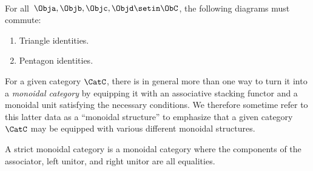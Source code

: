 \begin{ctdefinition}
    \condit\\
    For all~$\Obja,\Objb,\Objc,\Objd\setin \ObC$, the following diagrams must commute:
    \begin{enumerate}
        \item Triangle identities.
        \item Pentagon identities.
    \end{enumerate}
\end{ctdefinition}

\begin{remark}
    For a given category $\CatC$, there is in general more than one way to turn it into a \emph{monoidal category} by equipping it with an associative stacking functor and a monoidal unit satisfying the necessary conditions.
    We therefore sometime refer to this latter data as a ``monoidal structure'' to emphasize that a given category $\CatC$ may be equipped with various different monoidal structures.
\end{remark}

\begin{remark}
    A strict monoidal category is a monoidal category where the components of the associator, left unitor, and right unitor are all equalities.
\end{remark}

